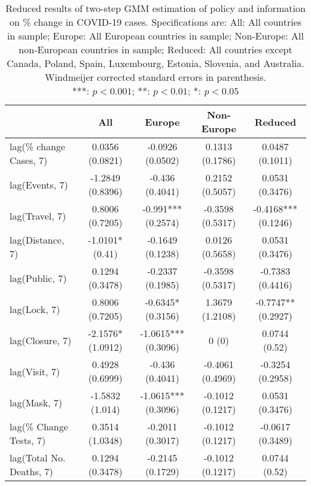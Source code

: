 \begin{table}[ht]
\centering
\begingroup\small
\begin{tabular}{lcccc}
  \toprule
 & All & Europe & Non-Europe & Reduced \\ 
  \midrule
lag(\% change Cases, 7) & 0.0356 (0.0821) & -0.0926 (0.0502) & 0.1313 (0.1786) & 0.0487 (0.1011) \\ 
  lag(Events, 7) & -1.2849 (0.8396) & -0.436 (0.4041) & 0.2152 (0.5057) & 0.0531 (0.3476) \\ 
  lag(Travel, 7) & 0.8006 (0.7205) & -0.991*** (0.2574) & -0.3598 (0.5317) & -0.4168*** (0.1246) \\ 
  lag(Distance, 7) & -1.0101* (0.41) & -0.1649 (0.1238) & 0.0126 (0.5658) & 0.0531 (0.3476) \\ 
  lag(Public, 7) & 0.1294 (0.3478) & -0.2337 (0.1985) & -0.3598 (0.5317) & -0.7383 (0.4416) \\ 
  lag(Lock, 7) & 0.8006 (0.7205) & -0.6345* (0.3156) & 1.3679 (1.2108) & -0.7747** (0.2927) \\ 
  lag(Closure, 7) & -2.1576* (1.0912) & -1.0615*** (0.3096) & 0 (0) & 0.0744 (0.52) \\ 
  lag(Visit, 7) & 0.4928 (0.6999) & -0.436 (0.4041) & -0.4061 (0.4969) & -0.3254 (0.2958) \\ 
  lag(Mask, 7) & -1.5832 (1.014) & -1.0615*** (0.3096) & -0.1012 (0.1217) & 0.0531 (0.3476) \\ 
  lag(\% Change Tests, 7) & 0.3514 (1.0348) & -0.2011 (0.3017) & -0.1012 (0.1217) & -0.0617 (0.3489) \\ 
  lag(Total No. Deaths, 7) & 0.1294 (0.3478) & -0.2145 (0.1729) & -0.1012 (0.1217) & 0.0744 (0.52) \\ 
   \bottomrule
\end{tabular}
\endgroup
\caption{Reduced results of two-step GMM estimation of policy and information on \% change in COVID-19 cases. Specifications are: All: All countries in sample; Europe: All European countries in sample; Non-Europe: All non-European countries in sample; Reduced: All countries except Canada, Poland, Spain, Luxembourg, Estonia, Slovenia, and Australia. \\ Windmeijer corrected standard errors in parenthesis. \\ ***: $p<0.001$; **: $p< 0.01$; *: $p< 0.05$} 
\label{tab_results:cases_reduced_wo_behavior}
\end{table}
